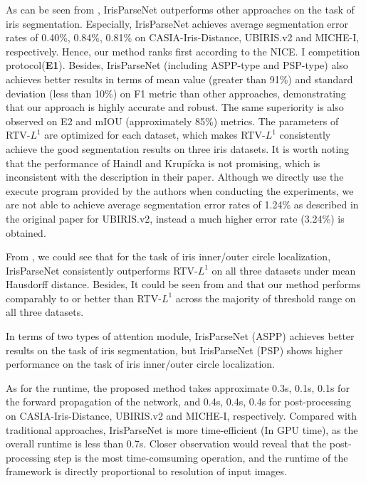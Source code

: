 \documentclass[journal]{IEEEtran}
\begin{document}
As can be seen from , IrisParseNet outperforms other approaches on the task of iris segmentation.
Especially, IrisParseNet achieves average segmentation error rates of 0.40\%, 0.84\%, 0.81\% on CASIA-Iris-Distance, UBIRIS.v2 and MICHE-I, respectively.
Hence, our method ranks first according to the NICE. I competition protocol(\textbf{E1}).
Besides, IrisParseNet (including ASPP-type and PSP-type) also achieves better results in terms of mean value (greater than 91\%) and standard deviation (less than 10\%) on F1 metric than other approaches, demonstrating that our approach is highly accurate and robust.
The same superiority is also observed on E2 and mIOU (approximately 85\%) metrics.
The parameters of RTV-$L^1$ are optimized for each dataset, which makes RTV-$L^1$ consistently achieve the good segmentation results on three iris datasets.
It is worth noting that the performance of Haindl and Krupi$\check{c}$ka\cite{haindl2015unsupervised} is not promising, which is inconsistent with the description in their paper.
Although we directly use the execute program provided by the authors when conducting the experiments, we are not able to achieve average segmentation error rates of 1.24\% as described in the original paper for UBIRIS.v2, instead a much higher error rate (3.24\%) is obtained.

From , we could see that for the task of iris inner/outer circle localization, IrisParseNet consistently outperforms RTV-$L^1$ on all three datasets under mean Hausdorff distance.
Besides, It could be seen from  and  that our method performs comparably to or better than RTV-$L^1$ across the majority of threshold range on all three datasets.

In terms of two types of attention module, IrisParseNet (ASPP) achieves better results on the task of iris segmentation, but IrisParseNet (PSP) shows higher performance on the task of iris inner/outer circle localization.

As for the runtime, the proposed method takes approximate 0.3s, 0.1s, 0.1s for the forward propagation of the network, and 0.4s, 0.4s, 0.4s for post-processing on CASIA-Iris-Distance, UBIRIS.v2 and MICHE-I, respectively.
Compared with traditional approaches, IrisParseNet is more time-efficient (In GPU time), as the overall runtime is less than 0.7s.
Closer observation would reveal that the post-processing step is the most time-comsuming operation, and the runtime of the framework is directly proportional to resolution of input images.
\end{document}
